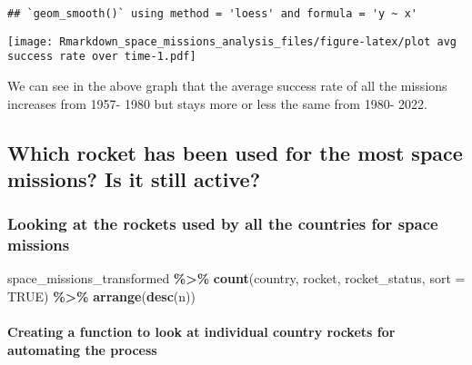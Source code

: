 \documentclass[
]{article}
\newenvironment{Shaded}{\begin{snugshade}}{\end{snugshade}}
\newcommand{\AttributeTok}[1]{\textcolor[rgb]{0.13,0.29,0.53}{#1}}
\newcommand{\ConstantTok}[1]{\textcolor[rgb]{0.56,0.35,0.01}{#1}}
\newcommand{\FunctionTok}[1]{\textcolor[rgb]{0.13,0.29,0.53}{\textbf{#1}}}
\newcommand{\NormalTok}[1]{#1}
\newcommand{\SpecialCharTok}[1]{\textcolor[rgb]{0.81,0.36,0.00}{\textbf{#1}}}
\begin{document}
\begin{verbatim}
## `geom_smooth()` using method = 'loess' and formula = 'y ~ x'
\end{verbatim}

\texttt{[image: Rmarkdown\_space\_missions\_analysis\_files/figure-latex/plot avg success rate over time-1.pdf]}

We can see in the above graph that the average success rate of all the
missions increases from 1957- 1980 but stays more or less the same from
1980- 2022.

\hypertarget{which-rocket-has-been-used-for-the-most-space-missions-is-it-still-active}{%
\subsection{\texorpdfstring{\textbf{Which rocket has been used for the
most space missions? Is it still
active?}}{Which rocket has been used for the most space missions? Is it still active?}}\label{which-rocket-has-been-used-for-the-most-space-missions-is-it-still-active}}

\hypertarget{looking-at-the-rockets-used-by-all-the-countries-for-space-missions}{%
\subsubsection{Looking at the rockets used by all the countries for
space
missions}\label{looking-at-the-rockets-used-by-all-the-countries-for-space-missions}}

\begin{Shaded}
\begin{Highlighting}[]
\NormalTok{space\_missions\_transformed }\SpecialCharTok{\%\textgreater{}\%}
  \FunctionTok{count}\NormalTok{(country, rocket, rocket\_status, }\AttributeTok{sort =} \ConstantTok{TRUE}\NormalTok{) }\SpecialCharTok{\%\textgreater{}\%}
  \FunctionTok{arrange}\NormalTok{(}\FunctionTok{desc}\NormalTok{(n))}
\end{Highlighting}
\end{Shaded}

\hypertarget{creating-a-function-to-look-at-individual-country-rockets-for-automating-the-process}{%
\paragraph{Creating a function to look at individual country rockets for
automating the
process}\label{creating-a-function-to-look-at-individual-country-rockets-for-automating-the-process}}
\end{document}
